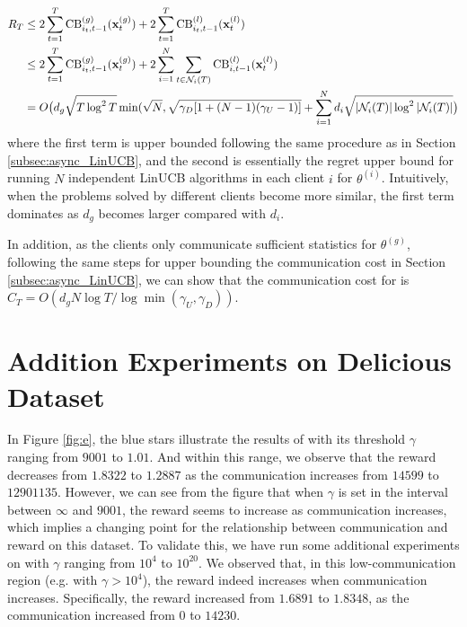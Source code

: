 \begin{align*}
    R_{T} & \leq 2 \sum_{t=1}^{T}\text{CB}^{(g)}_{i_{t},t-1}(\mathbf{x}_{t}^{(g)}) + 2 \sum_{t=1}^{T} \text{CB}^{(l)}_{i_{t},t-1}(\mathbf{x}_{t}^{(l)}) \\
    & \leq 2 \sum_{t=1}^{T}\text{CB}^{(g)}_{i_{t},t-1}(\mathbf{x}_{t}^{(g)}) + 2 \sum_{i=1}^{N} \sum_{t \in \mathcal{N}_{i}(T)} \text{CB}^{(l)}_{i,t-1}(\mathbf{x}_{t}^{(l)}) \\
    & = O\bigl(d_{g}\sqrt{T\log^{2}{T}}\min(\sqrt{N},\sqrt{\gamma_{D} [1+(N-1)(\gamma_{U}-1)]} + \sum_{i=1}^{N} d_{i} \sqrt{|\mathcal{N}_{i}(T)|\log^{2}{|\mathcal{N}_{i}(T)|}}\bigr)
\end{align*}
where the first term is upper bounded following the same procedure as in Section \ref{subsec:async_LinUCB}, and the second is essentially the regret upper bound for running $N$ independent LinUCB algorithms in each client $i$ for $\theta^{(i)}$. Intuitively, when the problems solved by different clients become more similar, the first term dominates as $d_{g}$ becomes larger compared with $d_{i}$.

In addition, as the clients only communicate sufficient statistics for $\theta^{(g)}$, following the same steps for upper bounding the communication cost in Section \ref{subsec:async_LinUCB}, we can show that the communication cost for \modeltwo{} is $C_{T}=O(d_{g} N\log{T}/\log{\min(\gamma_{U},\gamma_{D})})$.



\section{Addition Experiments on Delicious Dataset}  \label{sec:additional_exp}
In Figure \ref{fig:e}, the blue stars illustrate the results of \modelone{} with its threshold $\gamma$ ranging from $9001$ to $1.01$. And within this range, we observe that the reward decreases from $1.8322$ to $1.2887$ as the communication increases from $14599$ to $12901135$. However, we can see from the figure that when $\gamma$ is set in the interval between $\infty$ and $9001$, the reward seems to increase as communication increases, which implies a changing point for the relationship between communication and reward on this dataset. To validate this, we have run some additional experiments on \modelone{} with $\gamma$ ranging from $10^{4}$ to $10^{20}$. We observed that, in this low-communication region (e.g. with $\gamma>10^{4}$), the reward indeed increases when communication increases. Specifically, the reward increased from $1.6891$ to $1.8348$, as the communication increased from $0$ to $14230$.
 
